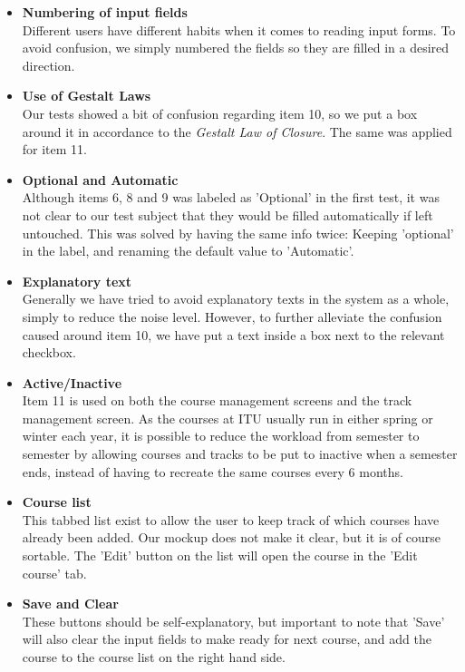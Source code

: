 \begin{itemize}
\item \textbf{Numbering of input fields} \\
Different users have different habits when it comes to reading input forms. To avoid confusion, we simply numbered the fields so they are filled in a desired direction.
\item \textbf{Use of Gestalt Laws} \\
Our tests showed a bit of confusion regarding item 10, so we put a box around it in accordance to the \emph{Gestalt Law of Closure}. The same was applied for item 11.
\item \textbf{Optional and Automatic} \\
Although items 6, 8 and 9 was labeled as 'Optional' in the first test, it was not clear to our test subject that they would be filled automatically if left untouched. This was solved by having the same info twice: Keeping 'optional' in the label, and renaming the default value to 'Automatic'.
\item \textbf{Explanatory text} \\
Generally we have tried to avoid explanatory texts in the system as a whole, simply to reduce the noise level\cite{steve}. However, to further alleviate the confusion caused around item 10, we have put a text inside a box next to the relevant checkbox.
\item \textbf{Active/Inactive} \\
Item 11 is used on both the course management screens and the track management screen. As the courses at ITU usually run in either spring or winter each year, it is possible to reduce the workload from semester to semester by allowing courses and tracks to be put to inactive when a semester ends, instead of having to recreate the same courses every 6 months.
\item \textbf{Course list} \\
This tabbed list exist to allow the user to keep track of which courses have already been added. Our mockup does not make it clear, but it is of course sortable. The 'Edit' button on the list will open the course in the 'Edit course' tab.
\item \textbf{Save and Clear} \\
These buttons should be self-explanatory, but important to note that 'Save' will also clear the input fields to make ready for next course, and add the course to the course list on the right hand side.
\end{itemize}

